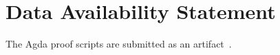 \documentclass[sigplan,dvipsnames,screen]{acmart}
\begin{document}
\section*{Data Availability Statement}

The Agda proof scripts are submitted as an artifact~\cite{thiemann25:_artif_what_i_alway_wanted}.




\end{document}
